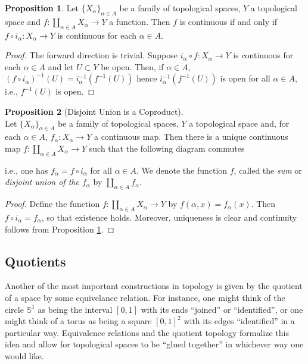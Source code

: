 \documentclass{book}
\theoremstyle{definition}
\newtheorem{proposition}{Proposition}[section]
\theoremstyle{remark}
\begin{document}
\begin{proposition}
\label{coprodcont}
Let $\{X_\alpha\}_{\alpha\in A}$ be a family of topological spaces, $Y$ a topological space and $f:\coprod_{\alpha\in A}X_\alpha\to Y$ a function. Then $f$ is continuous if and only if $f\circ i_\alpha:X_\alpha\to Y$ is continuous for each $\alpha\in A$.
\end{proposition}
\begin{proof}
The forward direction is trivial. Suppose $i_\alpha\circ f:X_\alpha\to Y$ is continuous for each $\alpha\in A$ and let $U\subset Y$ be open. Then, if $\alpha\in A$, $(f\circ i_\alpha)^{-1}(U)=i_\alpha^{-1}(f^{-1}(U))$ hence $i_\alpha^{-1}(f^{-1}(U))$ is open for all $\alpha\in A$, i.e., $f^{-1}(U)$ is open.
\end{proof}

\begin{proposition}[Disjoint Union is a Coproduct]$ $\\
Let $\{X_\alpha\}_{\alpha\in A}$ be a family of topological spaces, $Y$ a topological space and, for each $\alpha\in A$, $f_\alpha:X_\alpha\to Y$ a continuous map. Then there is a unique continuous map $f:\coprod_{\alpha\in A}X_\alpha\to Y$ such that the following diagram commutes
\begin{center}
\end{center}
i.e., one has $f_\alpha=f\circ i_\alpha$ for all $\alpha\in A$. We denote the function $f$, called the \textit{sum} or \textit{disjoint union of the $f_\alpha$} by $\coprod_{\alpha\in A}f_\alpha$.
\end{proposition}
\begin{proof}
Define the function $f:\coprod_{\alpha\in A}X_\alpha\to Y$ by $f(\alpha,x)=f_\alpha(x)$. Then $f\circ i_\alpha=f_\alpha$, so that existence holds. Moreover, uniqueness is clear and continuity follows from Proposition \ref{coprodcont}.
\end{proof}

\subsection{Quotients}
Another of the most important constructions in topology is given by the quotient of a space by some equivelance relation. For instance, one might think of the circle $\mathbb S^1$ as being the interval $[0,1]$ with its ends ``joined'' or ``identified'', or one might think of a torus as being a square $[0,1]^2$ with its edges ``identified'' in a particular way. Equivalence relations and the quotient topology formalize this idea and allow for topological spaces to be ``glued together'' in whichever way one would like.
\end{document}
